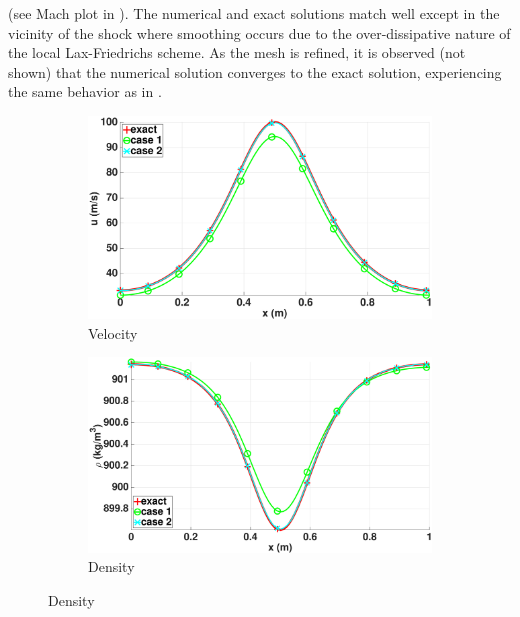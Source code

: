 (see Mach plot in ). The numerical and exact solutions match  well except in the vicinity of the shock where smoothing occurs due to the over-dissipative nature of the local Lax-Friedrichs scheme. As the mesh is refined, it is observed (not shown) that the numerical solution converges to the exact solution, experiencing the same behavior as in .
%
\begin{figure}[H]
        \centering
        \begin{subfigure}[b]{0.5\textwidth}
                \centering
                \includegraphics[width=\textwidth]{figures/liquid_velocity_llf_and_exact_100.eps}
                \caption{Velocity}
                \label{fig:liq-phase-vel}
        \end{subfigure}%
        \begin{subfigure}[b]{0.5\textwidth}
                \centering
                \includegraphics[width=\textwidth]{figures/liquid_density_llf_and_exact_100.eps}
                \caption{Density}
                \label{fig:liq-phase-density}
        \end{subfigure}
        

\end{figure}
